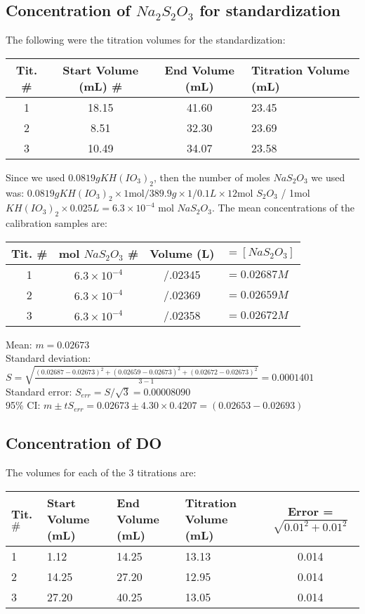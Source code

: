 \subsection{Concentration of $Na_2S_2O_3$ for standardization}
The following were the titration volumes for the standardization:
\begin{center}
    \begin{tabular}{ | c|  c | c | l |}
    \hline
    Tit. \# & Start Volume (mL) \# & End Volume (mL) & Titration Volume (mL)\\ \hline
    1 & 18.15 & 41.60 & 23.45 \\ \hline
    2 & 8.51 & 32.30 & 23.69  \\ \hline
    3 & 10.49 & 34.07 & 23.58 \\ \hline
    \end{tabular}
\end{center}
Since we used $0.0819g KH(IO_3)_2$, then the number of moles $NaS_2O_3$ we used was:
$0.0819 g KH(IO_3)_2 \times 1 $mol$ / 389.9g \times 1 / 0.1L \times 12$mol $S_2O_3$ / 1mol $KH(IO_3)_2 \times 0.025L = 6.3\times10^{-4}$ mol $NaS_2O_3$. 
The mean concentrations of the calibration samples are:
\begin{center}
    \begin{tabular}{ | c|  c | c | l |}
    \hline
    Tit. \# & mol $NaS_2O_3 $  \# & Volume (L) & $=[NaS_2O_3]$\\ \hline
    1 & $6.3\times10^{-4}$ & /.02345 & $=0.02687M$ \\ \hline
    2 & $6.3\times10^{-4}$ & /.02369 & $=0.02659M$  \\ \hline
    3 & $6.3\times10^{-4}$ & /.02358 & $=0.02672M$ \\ \hline
    \end{tabular}
\end{center}
Mean: $m = 0.02673$ \\
Standard deviation: $S = \sqrt{\frac{(0.02687-0.02673)^2 + (0.02659-0.02673)^2 + (0.02672-0.02673)^2}{3-1}} = 0.0001401$ \\
Standard error: $S_{err} = S / \sqrt{3} = 0.00008090$ \\
95\% CI: $m \pm t S_{err} = 0.02673 \pm 4.30 \times 0.4207 = (0.02653-0.02693)$ \\

\subsection{Concentration of DO}
The volumes for each of the 3 titrations are:
\begin{center}
    \begin{tabular}{ | p{1.5cm}|  p{2cm} | p{2cm} | p{3cm} | c|}
    \hline
    Tit. $\#$ & Start Volume (mL) & End Volume (mL) & Titration Volume (mL) & Error = $\sqrt{0.01^2 + 0.01^2}$\\ \hline
    1 & 1.12 & 14.25 & 13.13 & 0.014\\ \hline
    2 & 14.25 & 27.20 & 12.95 & 0.014 \\ \hline
    3 & 27.20 & 40.25 & 13.05 & 0.014\\ \hline
    \end{tabular}
\end{center}

